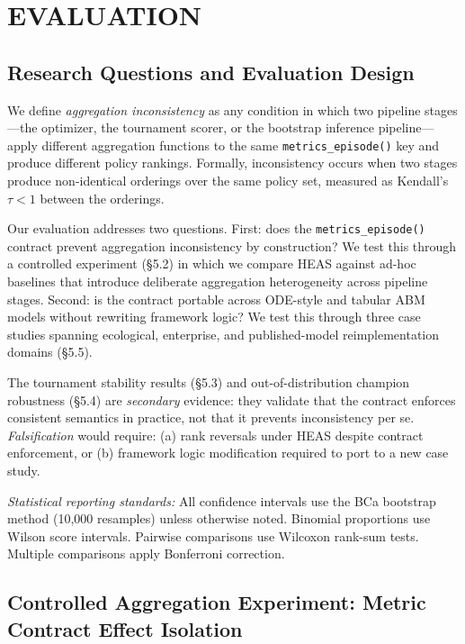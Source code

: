 \documentclass{wscpaperproc}
\begin{document}
\section{EVALUATION}

\subsection{Research Questions and Evaluation Design}

We define \emph{aggregation inconsistency} as any condition in which two pipeline
stages---the optimizer, the tournament scorer, or the bootstrap inference
pipeline---apply different aggregation functions to the same
\texttt{metrics\_episode()} key and produce different policy rankings. Formally,
inconsistency occurs when two stages produce non-identical orderings over the
same policy set, measured as Kendall's~$\tau < 1$ between the orderings.

Our evaluation addresses two questions. First: does the \texttt{metrics\_episode()}
contract prevent aggregation inconsistency by construction? We test this through
a controlled experiment (\S5.2) in which we compare HEAS
against ad-hoc baselines that introduce deliberate aggregation heterogeneity across
pipeline stages. Second: is the contract portable across ODE-style and tabular
ABM models without rewriting framework logic? We test this through three case
studies spanning ecological, enterprise, and published-model reimplementation
domains (\S5.5).

The tournament stability results (\S5.3) and out-of-distribution
champion robustness (\S5.4) are \emph{secondary} evidence: they
validate that the contract enforces consistent semantics in practice, not that
it prevents inconsistency per se. \emph{Falsification} would require: (a) rank
reversals under HEAS despite contract enforcement, or (b) framework logic
modification required to port to a new case study.

\emph{Statistical reporting standards:} All confidence intervals use the BCa
bootstrap method (10,000 resamples) unless otherwise noted. Binomial proportions
use Wilson score intervals. Pairwise comparisons use Wilcoxon rank-sum tests.
Multiple comparisons apply Bonferroni correction.


\subsection{Controlled Aggregation Experiment: Metric Contract Effect Isolation}
\label{sec:controlled-agg}
\end{document}
